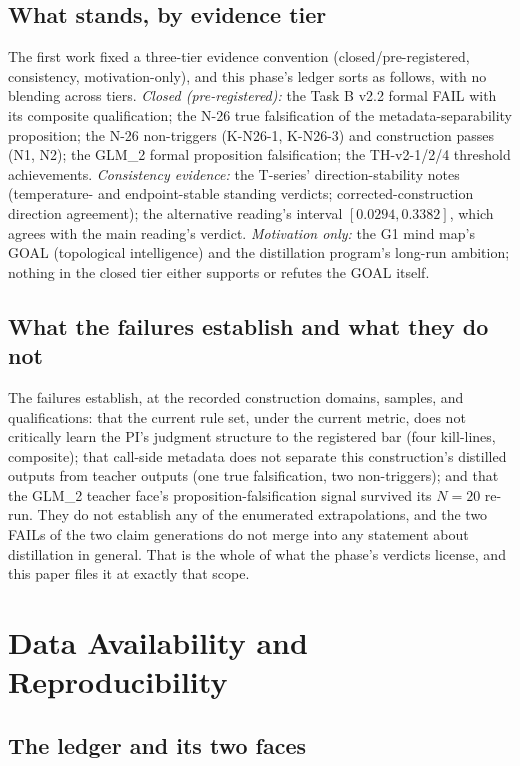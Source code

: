 \documentclass[11pt]{article}
\begin{document}
\subsection{What stands, by evidence tier}

The first work fixed a three-tier evidence convention (closed/pre-registered, consistency, motivation-only), and this phase's ledger sorts as follows, with no blending across tiers. \emph{Closed (pre-registered):} the Task B v2.2 formal FAIL with its composite qualification; the N-26 true falsification of the metadata-separability proposition; the N-26 non-triggers (K-N26-1, K-N26-3) and construction passes (N1, N2); the GLM\_2 formal proposition falsification; the TH-v2-1/2/4 threshold achievements. \emph{Consistency evidence:} the T-series' direction-stability notes (temperature- and endpoint-stable standing verdicts; corrected-construction direction agreement); the alternative reading's interval $[0.0294, 0.3382]$, which agrees with the main reading's verdict. \emph{Motivation only:} the G1 mind map's GOAL (topological intelligence) and the distillation program's long-run ambition; nothing in the closed tier either supports or refutes the GOAL itself.

\subsection{What the failures establish and what they do not}

The failures establish, at the recorded construction domains, samples, and qualifications: that the current rule set, under the current metric, does not critically learn the PI's judgment structure to the registered bar (four kill-lines, composite); that call-side metadata does not separate this construction's distilled outputs from teacher outputs (one true falsification, two non-triggers); and that the GLM\_2 teacher face's proposition-falsification signal survived its $N = 20$ re-run. They do not establish any of the enumerated extrapolations, and the two FAILs of the two claim generations do not merge into any statement about distillation in general. That is the whole of what the phase's verdicts license, and this paper files it at exactly that scope.

\section{Data Availability and Reproducibility}\label{sec:availability}

\subsection{The ledger and its two faces}
\end{document}
